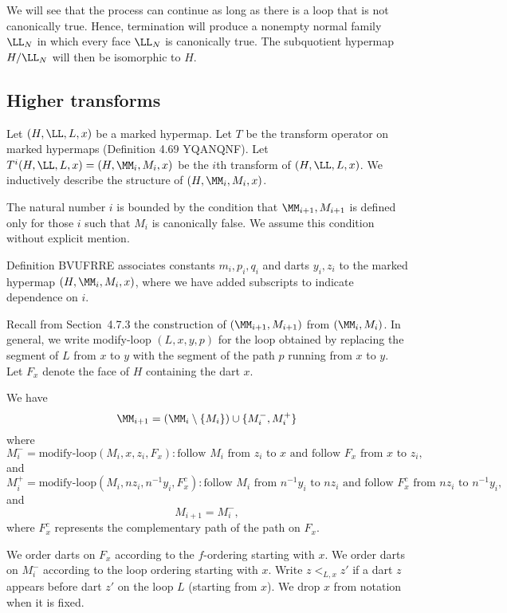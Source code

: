 We will see that the process can continue as long as there is a 
loop that is not canonically true.  Hence, termination will produce
a nonempty normal family $\LL_N$ in which every face $\LL_N$ is 
canonically true.  The subquotient hypermap $H/\LL_N$
will then be isomorphic to $H$.

\subsection{Higher transforms}


Let $(H,\LL,L,x)$ be a marked hypermap.  
Let $T$ be the transform operator on marked hypermaps
(Definition 4.69 YQANQNF).  
Let $T^i(H,\LL,L,x) = (H,\MM_i,M_i,x)$ be the $i$th transform of
$(H,\LL,L,x)$.  We inductively describe the structure of $(H,\MM_i,M_i,x)$.

The natural number $i$ is bounded by the condition that $\MM_{i+1},M_{i+1}$ is defined only for those $i$ such that $M_i$ is canonically false.
We assume this condition without explicit mention.

Definition BVUFRRE associates constants $m_i,p_i,q_i$ and darts $y_i,z_i$
to the marked hypermap $(H,\MM_i,M_i,x)$, where we have added
subscripts to indicate dependence on $i$.


Recall from Section~4.7.3 the construction of $(\MM_{i+1},M_{i+1})$
from $(\MM_i,M_i)$. 
In general, we write modify-loop $(L,x,y,p)$ for the loop obtained
by replacing the segment of $L$ from $x$ to $y$ with the segment
of the path $p$ running from $x$ to $y$.
Let $F_x$ denote the face of $H$ containing the dart $x$. 

\begin{lemma} 
We have 
\[
\MM_{i+1} = (\MM_i \setminus \{M_i\}) \cup \{M_i^-,M_i^+\}
\]
where 
\[
M_i^- = \text{modify-loop} (M_i,x,z_i,F_x): 
  \text{follow } M_i \text{ from } z_i \text{ to } x
  \text{ and follow } F_x \text{ from } x \text{ to } z_i,
\]
and
\[
M_i^+ = \text{modify-loop} (M_i,nz_i,n^{-1}y_i,F^c_x): 
\text{follow } M_i \text{ from } n^{-1} y_i \text{ to } n z_i
  \text{ and follow } F^c_x \text{ from } nz_i \text{ to } n^{-1} y_i,
\]
and 
\[
M_{i+1} = M_i^-,
\]
where $F^c_x$ represents the complementary path of the path on $F_x$.
\end{lemma} 

We order darts on $F_x$ according to the $f$-ordering starting with $x$.
We order darts on $M_i^-$ 
according to the loop ordering starting with $x$.
Write $z <_{L,x} z'$ if a dart $z$ appears before dart $z'$ on the loop $L$
(starting from $x$).  We drop $x$ from notation when it is fixed.

